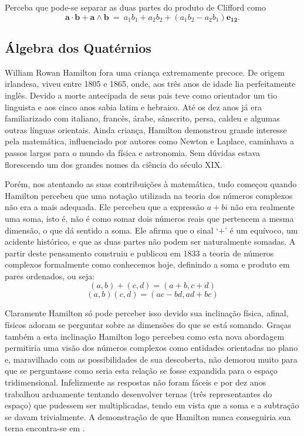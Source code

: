 \documentclass[a4paper,12pt]{report}
\theoremstyle{plain}
\theoremstyle{definition}
\begin{document}
	
	
	Perceba que pode-se separar as duas partes do produto de Clifford como $$\mathbf{a\cdot b} + \mathbf{a \wedge b} \ = \ a_1b_1 + a_2b_2 + (a_1b_2 - a_2b_1)\mathbf{e_{12}}.$$
	
	\subsection{Álgebra dos Quatérnios}
	William Rowan Hamilton fora uma criança extremamente precoce. De origem irlandesa, viveu entre 1805 e 1865, onde, aos três anos de idade lia perfeitamente inglês. Devido a morte antecipada de seus pais teve como orientador um tio linguista e aos cinco anos sabia latim e hebraico. Até os dez anos já era familiarizado com italiano, francês, árabe, sânscrito, persa, caldeu e algumas outras línguas orientais. Ainda criança, Hamilton demonstrou grande interesse pela matemática, influenciado por autores como Newton e Laplace, caminhava a passos largos para o mundo da física e astronomia. Sem dúvidas estava florescendo um dos grandes nomes da ciência do século XIX. \cite{BoyerMathHistory,AlgebraAbstrata2BienalSBM}
	
	Porém, nos atentando as suas contribuições à matemática, tudo começou quando Hamilton percebeu que uma notação utilizada na teoria dos números complexos não era a mais adequada. Ele percebeu que a expressão $a + bi$ não era realmente uma soma, isto é, não é como somar dois números reais que pertencem a mesma dimensão, o que dá sentido a soma. Ele afirma que o sinal ‘$+$’ é um equívoco, um acidente histórico, e que as duas partes não podem ser naturalmente somadas. A partir deste pensamento construiu e publicou em 1833 a teoria de números complexos formalmente como conhecemos hoje, definindo a soma e produto em pares ordenados, ou seja:
	\begin{equation*}
		(a,b) + (c,d) = (a + b, c + d)
	\end{equation*}
	\begin{equation*}
		(a, b)(c, d) = (ac-bd, ad + bc)
	\end{equation*}
	
	Claramente Hamilton só pode perceber isso devido sua inclinação física, afinal, físicos adoram se perguntar sobre as dimensões do que se está somando. Graças também a esta inclinação Hamilton logo percebeu como esta nova abordagem permitiria uma visão dos números complexos como entidades orientadas no plano e, maravilhado com as possibilidades de sua descoberta, não demorou muito para que se perguntasse como seria esta relação se fosse expandida para o espaço tridimensional. Infelizmente as respostas não foram fáceis e por dez anos trabalhou arduamente tentando desenvolver ternas (três representantes do espaço) que pudessem ser multiplicadas, tendo em vista que a soma e a subtração se davam trivialmente. A demonstração de que Hamilton nunca conseguiria sua terna encontra-se em \cite{QuaterniosJucineide}. 
	
\end{document}
